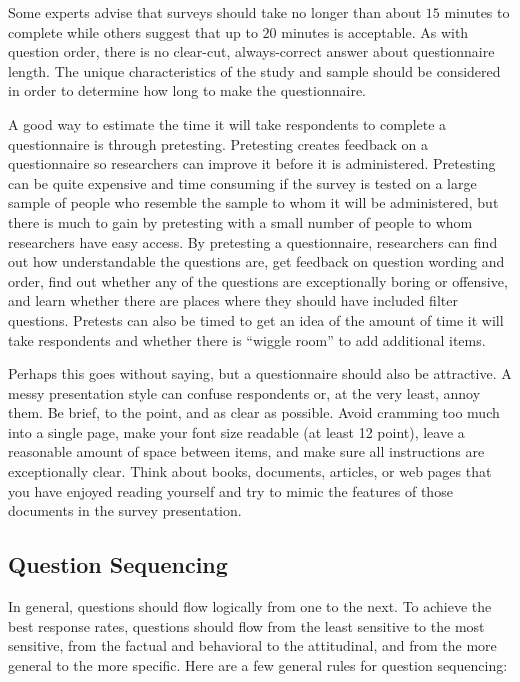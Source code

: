 Some experts advise that surveys should take no longer than about $ 15 $ minutes to complete while others suggest that up to $ 20 $ minutes is acceptable. As with question order, there is no clear-cut, always-correct answer about questionnaire length. The unique characteristics of the study and sample should be considered in order to determine how long to make the questionnaire.

A good way to estimate the time it will take respondents to complete a questionnaire is through pretesting. Pretesting creates feedback on a questionnaire so researchers can improve it before it is administered. Pretesting can be quite expensive and time consuming if the survey is tested on a large sample of people who resemble the sample to whom it will be administered, but there is much to gain by pretesting with a small number of people to whom researchers have easy access. By pretesting a questionnaire, researchers can find out how understandable the questions are, get feedback on question wording and order, find out whether any of the questions are exceptionally boring or offensive, and learn whether there are places where they should have included filter questions. Pretests can also be timed to get an idea of the amount of time it will take respondents and whether there is ``wiggle room'' to add additional items.

Perhaps this goes without saying, but a questionnaire should also be attractive. A messy presentation style can confuse respondents or, at the very least, annoy them. Be brief, to the point, and as clear as possible. Avoid cramming too much into a single page, make your font size readable (at least 12 point), leave a reasonable amount of space between items, and make sure all instructions are exceptionally clear. Think about books, documents, articles, or web pages that you have enjoyed reading yourself and try to mimic the features of those documents in the survey presentation.

\subsection{Question Sequencing}

In general, questions should flow logically from one to the next. To achieve the best response rates, questions should flow from the least sensitive to the most sensitive, from the factual and behavioral to the attitudinal, and from the more general to the more specific. Here are a few general rules for question sequencing:

